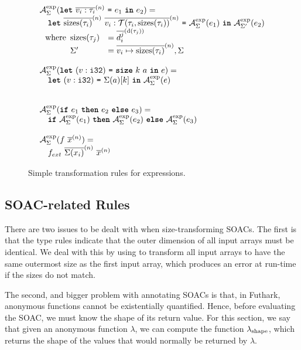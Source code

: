 \begin{figure}

\[
\begin{array}{l}
  \mathcal{A}_{\Sigma}^{\text{exp}}(\mbox{\texttt{\bfseries{let}}}~\overline{v_{i}: \tau_{i}}^{(n)}~\mbox{\texttt{=}}~e_{1}~\mbox{\texttt{\bfseries{in}}}~e_{2}) = \\
  \quad \mbox{\texttt{\bfseries{let}}}~\overline{\textrm{sizes}(\tau_{i})}^{(n)}~\overline{v_{i}: \mathcal{T}(\tau_{i},\textrm{sizes}(\tau_{i}))}^{(n)}~\mbox{\texttt{=}}~\mathcal{A}_{\Sigma}^{\text{exp}}(e_{1})~\mbox{\texttt{\bfseries{in}}}~\mathcal{A}_{\Sigma'}^{\text{exp}}(e_{2}) \\
  ~~ \textrm{where}
  \begin{array}[t]{ll}
    \textrm{sizes}(\tau_j) &= \overline{d^{j}_{i}}^{(\textrm{d}(\tau_{j}))} \\
    \Sigma' &=\overline{v_{i}\mapsto\textrm{sizes}(\tau_{i})}^{(n)},\Sigma
  \end{array}
  \\
  \\
\mathcal{A}_{\Sigma}^{\text{exp}}(\mbox{\texttt{\bfseries{let}}}~(v: \texttt{i32})~\mbox{\texttt{=}}~\mbox{\texttt{\bfseries{size}}}~k~a~\mbox{\texttt{\bfseries{in}}}~e) = \\
\quad \mbox{\texttt{\bfseries{let}}}~(v: \texttt{i32})~\mbox{\texttt{=}}~\Sigma(a)[k]~\mbox{\texttt{\bfseries{in}}}~\mathcal{A}_{\Sigma}^{\text{exp}}(e) \\
\\
\\
\mathcal{A}_{\Sigma}^{\text{exp}}(\mbox{\texttt{\bfseries{if}}}~e_{1}~\mbox{\texttt{\bfseries{then}}}~e_{2}~\mbox{\texttt{\bfseries{else}}}~e_{3}) = \\
\quad \mbox{\texttt{\bfseries{if}}}~\mathcal{A}_{\Sigma}^{\text{exp}}(e_{1})~\mbox{\texttt{\bfseries{then}}}~\mathcal{A}_{\Sigma}^{\text{exp}}(e_{2})~\mbox{\texttt{\bfseries{else}}}~\mathcal{A}_{\Sigma}^{\text{exp}}(e_{3})
  \\
  \\
  \mathcal{A}_{\Sigma}^{\text{exp}}(f~\overline{x}^{(n)}) = \\
  \quad f_{ext}~\overline{\Sigma(x_{i})}^{(n)}~\overline{x}^{(n)}
\end{array}
\]

\caption{Simple transformation rules for expressions.}
\label{fig:simple-transformation-rules}
\end{figure}

\subsection{SOAC-related Rules}
\label{sec:SOACSizeRules}

There are two issues to be dealt with when size-transforming SOACs.
The first is that the type rules indicate that the outer dimension of
all input arrays must be identical.  We deal with this by using
 to transform all input arrays to have the same outermost
size as the first input array, which produces an error at run-time if
the sizes do not match.

The second, and bigger problem with annotating SOACs is that, in
Futhark, anonymous functions cannot be existentially quantified.
Hence, before evaluating the SOAC, we must know the shape of its
return value.  For this section, we say that given an anonymous
function \(\lambda\), we can compute the function
\(\lambda_{\textrm{shape}}\), which returns the shape of the values that would
normally be returned by \(\lambda\).

